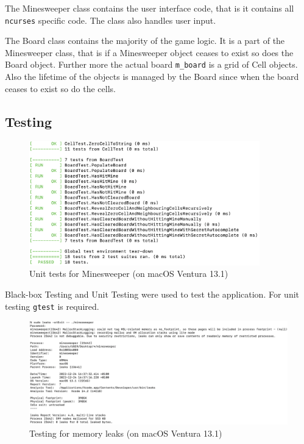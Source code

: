 \documentclass[12pt]{article}
\begin{document}
The Minesweeper class contains the user interface code, that
is it contains all \texttt{ncurses} specific code. The class
also handles user input.

The Board class contains the majority of the game logic. It is a
part of the Minesweeper class, that is if a Minesweeper object
ceases to exist so does the Board object. Further more the
actual board \texttt{m\_board} is a grid of Cell objects. Also
the lifetime of the objects is managed by the Board since when
the board ceases to exist so do the cells.

\subsection{Testing}

\begin{figure}[H]
    \centering
    \includegraphics[width=10cm]{./images/unit-tests-minesweeper.png}
    \caption{Unit tests for Minesweeper (on macOS Ventura 13.1)}
\end{figure}

Black-box Testing and Unit Testing were used to test the
application. For unit testing \texttt{gtest} is required.

\begin{figure}[H]
    \centering
    \includegraphics[width=14cm]{./images/leaks-minesweeper.png}
    \caption{Testing for memory leaks (on macOS Ventura 13.1)}
\end{figure}
\end{document}

